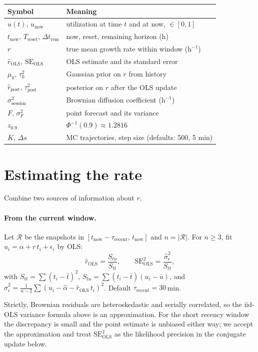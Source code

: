 \documentclass[11pt]{article}
\newcommand{\sighat}{\hat\sigma}
\newcommand{\rpost}{\hat r_{\text{post}}}
\newcommand{\taupostsq}{\tau_{\text{post}}^2}
\newcommand{\tauzerosq}{\tau_0^2}
\newcommand{\rols}{\hat r_{\text{OLS}}}
\newcommand{\seols}{\mathrm{SE}_{\text{OLS}}}
\newcommand{\seolssq}{\mathrm{SE}_{\text{OLS}}^2}
\newcommand{\sigsessionsq}{\sigma_{\text{session}}^2}
\newcommand{\unow}{u_{\text{now}}}
\newcommand{\tnow}{t_{\text{now}}}
\newcommand{\Treset}{T_{\text{reset}}}
\newcommand{\Dtrem}{\Delta t_{\text{rem}}}
\newcommand{\taurecent}{\tau_{\text{recent}}}
\begin{document}
\begin{center}
\begin{tabular}{@{}ll@{}}
\toprule
Symbol & Meaning \\
\midrule
$u(t),\, \unow$              & utilization at time $t$ and at now, $\in [0,1]$ \\
$\tnow,\, \Treset,\, \Dtrem$ & now, reset, remaining horizon (h) \\
$r$                          & true mean growth rate within window ($\mathrm{h}^{-1}$) \\
$\rols,\, \seols$            & OLS estimate and its standard error \\
$\mu_0,\, \tauzerosq$        & Gaussian prior on $r$ from history \\
$\rpost,\, \taupostsq$       & posterior on $r$ after the OLS update \\
$\sigsessionsq$              & Brownian diffusion coefficient ($\mathrm{h}^{-1}$) \\
$F,\, \sigma_F^2$            & point forecast and its variance \\
$z_{0.9}$                    & $\Phi^{-1}(0.9) \approx 1.2816$ \\
$K,\, \Delta s$              & MC trajectories, step size (defaults: 500, 5 min) \\
\bottomrule
\end{tabular}
\end{center}

\section{Estimating the rate}\label{sec:rate}

Combine two sources of information about $r$.

\paragraph{From the current window.} Let $\mathcal{R}$ be the snapshots in
$[\tnow - \taurecent,\, \tnow]$ and $n = \lvert\mathcal{R}\rvert$. For $n
\geq 3$, fit $u_i = \alpha + r\,t_i + \epsilon_i$ by OLS:
\[
  \rols = \frac{S_{tu}}{S_{tt}},
  \qquad \seolssq = \frac{\sighat_\epsilon^2}{S_{tt}},
\]
with $S_{tt} = \sum (t_i - \bar t)^2$, $S_{tu} = \sum (t_i - \bar t)(u_i -
\bar u)$, and $\sighat_\epsilon^2 = \tfrac{1}{n-2} \sum (u_i - \hat\alpha -
\rols\,t_i)^2$. Default $\taurecent = 30$\,min.

Strictly, Brownian residuals are heteroskedastic and serially correlated, so
the iid-OLS variance formula above is an approximation. For the short
recency window the discrepancy is small and the point estimate is unbiased
either way; we accept the approximation and treat $\seolssq$ as the
likelihood precision in the conjugate update below.
\end{document}
